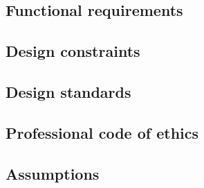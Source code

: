 \documentclass[../main.tex]{subfiles}
\begin{document}
\subsection{Functional requirements}

\blindtext

\subsection{Design constraints}

\blindtext

\subsection{Design standards}

\blindtext

\subsection{Professional code of ethics}

\blindtext

\subsection{Assumptions}

\blindtext
\end{document}
